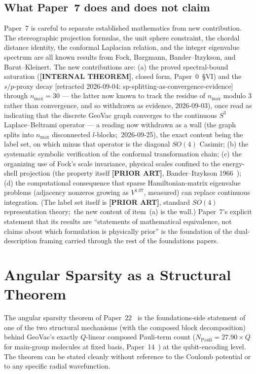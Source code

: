 \documentclass[aps,pra,twocolumn,superscriptaddress,longbibliography]{revtex4-2}
\newcommand{\gvq}[2]{#2}
\begin{document}
\subsection*{What Paper~7 does and does not claim}

Paper~7 is careful to separate established mathematics from new
contribution.  The stereographic projection formulas, the unit sphere
constraint, the chordal distance identity, the conformal Laplacian
relation, and the integer eigenvalue spectrum are all known results
from Fock, Bargmann, Bander--Itzykson, and Barut--Kleinert.  The new
contributions are: (a) the proved spectral-bound saturation
(\textbf{[INTERNAL THEOREM]}, closed form, Paper~0~\S VI) and the
$s/p$-proxy decay [retracted 2026-09-04: sp-splitting-as-convergence-evidence] through $n_{\max} = 30$ --- the latter now known to
track the residue of $n_{\max}$ modulo $3$ rather than convergence, and so
withdrawn as evidence, 2026-09-03), once read as indicating that the
discrete GeoVac graph converges to the continuous $S^3$
Laplace--Beltrami operator --- a reading now withdrawn as a wall (the
graph splits into $n_{\max}$ disconnected $l$-blocks;\ 2026-09-25), the
exact content being the label set, on which minus that operator is the
diagonal $SO(4)$ Casimir; (b)
the systematic symbolic verification of the conformal transformation
chain; (c) the organizing use of Fock's scale invariance, physical
scales confined to the energy-shell projection (the property itself
\textbf{[PRIOR ART]}, Bander--Itzykson 1966~\cite{bander_itzykson1966}); (d) the computational consequence that
sparse Hamiltonian-matrix eigenvalue problems (adjacency nonzeros
growing as $V^{1.07}$, measured) can replace
continuous integration.  (The label set itself is \textbf{[PRIOR ART]},
standard $SO(4)$ representation theory;\ the new content of item~(a) is
the wall.)  Paper~7's explicit statement that its results are
``statements of mathematical equivalence, not claims about which
formulation is physically prior'' is the foundation of the
dual-description framing carried through the rest of the foundations
papers.

\section{Angular Sparsity as a Structural Theorem}
\label{sec:angular}

The angular sparsity theorem of Paper~22~\cite{loutey_paper22} is the
foundations-side statement of one of the two structural mechanisms (with
the composed block decomposition) behind GeoVac's
exactly $Q$-linear composed Pauli-term count
($N_{\mathrm{Pauli}} = \gvq{composed_coeff}{27.90} \times Q$ for main-group molecules at fixed basis, Paper~14~\cite{loutey_paper14}) at
the qubit-encoding level.  The
theorem can be stated cleanly without reference to the Coulomb
potential or to any specific radial wavefunction.
\end{document}
